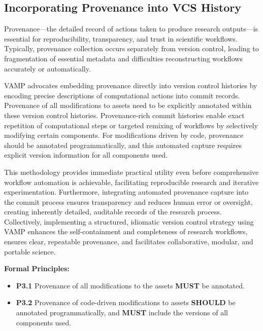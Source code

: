 \documentclass{article}
\begin{document}
\subsection{Incorporating Provenance into VCS History}

Provenance—the detailed record of actions taken to produce research outputs—is essential for reproducibility, transparency, and trust in scientific workflows.
Typically, provenance collection occurs separately from version control, leading to fragmentation of essential metadata and difficulties reconstructing workflows accurately or automatically.

VAMP advocates embedding provenance directly into version control histories by encoding precise descriptions of computational actions into commit records.
Provenance of all modifications to assets need to be explicitly annotated within these version control histories.
Provenance-rich commit histories enable exact repetition of computational steps or targeted remixing of workflows by selectively modifying certain components.
For modifications driven by code, provenance should be annotated programmatically, and this automated capture requires explicit version information for all components used.

This methodology provides immediate practical utility even before comprehensive workflow automation is achievable, facilitating reproducible research and iterative experimentation.
Furthermore, integrating automated provenance capture into the commit process ensures transparency and reduces human error or oversight, creating inherently detailed, auditable records of the research process.
Collectively, implementing a structured, idiomatic version control strategy using VAMP enhances the self-containment and completeness of research workflows, ensures clear, repeatable provenance, and facilitates collaborative, modular, and portable science.

\textbf{Formal Principles:}

\begin{itemize}
    \item \textbf{P3.1} Provenance of all modifications to the assets \textbf{MUST} be annotated.
    \item \textbf{P3.2} Provenance of code-driven modifications to assets \textbf{SHOULD} be annotated programmatically, and \textbf{MUST} include the versions of all components used.
\end{itemize}
\end{document}
